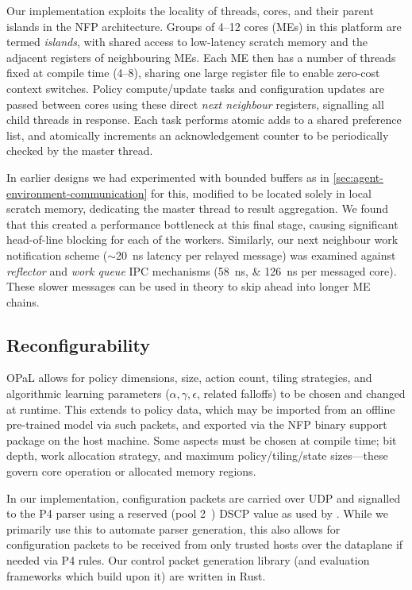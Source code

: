 \documentclass[sigconf,natbib=false]{acmart}
\newcommand{\approachshort}{OPaL}
\begin{document}
Our implementation exploits the locality of threads, cores, and their parent islands in the NFP architecture.
Groups of \numrange{4}{12} cores (MEs) in this platform are termed \emph{islands}, with shared access to low-latency scratch memory and the adjacent registers of neighbouring MEs.
Each ME then has a number of threads fixed at compile time (\numrange{4}{8}), sharing one large register file to enable zero-cost context switches.
Policy compute/update tasks and configuration updates are passed between cores using these direct \emph{next neighbour} registers, signalling all child threads in response.
Each task performs atomic adds to a shared preference list, and atomically increments an acknowledgement counter to be periodically checked by the master thread.

In earlier designs we had experimented with bounded buffers as in \cref{sec:agent-environment-communication} for this, modified to be located solely in local scratch memory, dedicating the master thread to result aggregation.
We found that this created a performance bottleneck at this final stage, causing significant head-of-line blocking for each of the workers.
Similarly, our next neighbour work notification scheme ($\sim$\SI{20}{\nano\second} latency per relayed message) was examined against \emph{reflector} and \emph{work queue} IPC mechanisms (\SIlist{58;126}{\nano\second} per messaged core).
These slower messages can be used in theory to skip ahead into longer ME chains.

\subsection{Reconfigurability}
\approachshort{} allows for policy dimensions, size, action count, tiling strategies, and algorithmic learning parameters ($\alpha, \gamma, \epsilon$, related falloffs) to be chosen and changed at runtime.
This extends to policy data, which may be imported from an offline pre-trained model via such packets, and exported via the NFP binary support package on the host machine.
Some aspects must be chosen at compile time; bit depth, work allocation strategy, and maximum policy/tiling/state sizes---these govern core operation or allocated memory regions.

In our implementation, configuration packets are carried over UDP and signalled to the P4 parser using a reserved (pool 2~\parencite{rfc2474}) DSCP value as used by \textcite{DBLP:conf/isca/LiLYCSH19}.
While we primarily use this to automate parser generation, this also allows for configuration packets to be received from only trusted hosts over the dataplane if needed via P4 rules.
Our control packet generation library (and evaluation frameworks which build upon it) are written in Rust.
\end{document}
